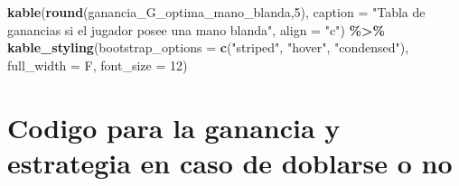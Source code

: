 \documentclass[12pt,a4paper,]{book}
\newenvironment{Shaded}{\begin{snugshade}}{\end{snugshade}}
\newcommand{\AttributeTok}[1]{\textcolor[rgb]{0.13,0.29,0.53}{#1}}
\newcommand{\DecValTok}[1]{\textcolor[rgb]{0.00,0.00,0.81}{#1}}
\newcommand{\FunctionTok}[1]{\textcolor[rgb]{0.13,0.29,0.53}{\textbf{#1}}}
\newcommand{\NormalTok}[1]{#1}
\newcommand{\SpecialCharTok}[1]{\textcolor[rgb]{0.81,0.36,0.00}{\textbf{#1}}}
\newcommand{\StringTok}[1]{\textcolor[rgb]{0.31,0.60,0.02}{#1}}
\numberwithin{dummy}{section}
\theoremstyle{ocrenumbox}
\theoremstyle{blacknumex}
\theoremstyle{blacknumbox}
\theoremstyle{ocrenum}
\theoremstyle{ocrenum}
\begin{document}
\begin{Shaded}
\begin{Highlighting}[]
\FunctionTok{kable}\NormalTok{(}\FunctionTok{round}\NormalTok{(ganancia\_G\_optima\_mano\_blanda,}\DecValTok{5}\NormalTok{), }
      \AttributeTok{caption =} \StringTok{"Tabla de ganancias si el jugador posee una mano blanda"}\NormalTok{,}
      \AttributeTok{align =} \StringTok{"c"}\NormalTok{) }\SpecialCharTok{\%\textgreater{}\%}
  \FunctionTok{kable\_styling}\NormalTok{(}\AttributeTok{bootstrap\_options =} \FunctionTok{c}\NormalTok{(}\StringTok{"striped"}\NormalTok{, }\StringTok{"hover"}\NormalTok{, }\StringTok{"condensed"}\NormalTok{),}
                \AttributeTok{full\_width =}\NormalTok{ F, }\AttributeTok{font\_size =} \DecValTok{12}\NormalTok{)}
\end{Highlighting}
\end{Shaded}

\hypertarget{codigo-para-la-ganancia-y-estrategia-en-caso-de-doblarse-o-no}{%
\section{Codigo para la ganancia y estrategia en caso de doblarse o
no}\label{codigo-para-la-ganancia-y-estrategia-en-caso-de-doblarse-o-no}}
\end{document}
